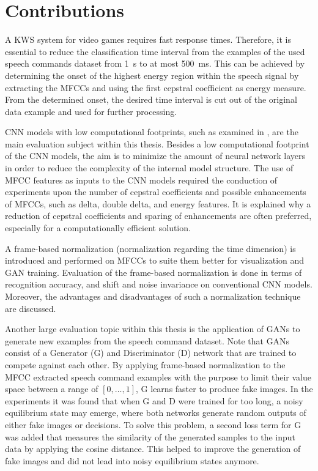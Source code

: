 
\section{Contributions}
A KWS system for video games requires fast response times.
Therefore, it is essential to reduce the classification time interval from the examples of the used speech commands dataset \cite{Warden2018} from \SI{1}{\second} to at most \SI{500}{\milli\second}.
This can be achieved by determining the onset of the highest energy region within the speech signal by extracting the MFCCs and using the first cepstral coefficient as energy measure.
From the determined onset, the desired time interval is cut out of the original data example and used for further processing.

CNN models with low computational footprints, such as examined in \cite{Sainath2015}, are the main evaluation subject within this thesis.
Besides a low computational footprint of the CNN models, the aim is to minimize the amount of neural network layers in order to reduce the complexity of the internal model structure.
The use of MFCC features as inputs to the CNN models required the conduction of experiments upon the number of cepstral coefficients and possible enhancements of MFCCs, such as delta, double delta, and energy features.
It is explained why a reduction of cepstral coefficients and sparing of enhancements are often preferred, especially for a computationally efficient solution.

A frame-based normalization (normalization regarding the time dimension) is introduced and performed on MFCCs to suite them better for visualization and GAN training.
Evaluation of the frame-based normalization is done in terms of recognition accuracy, and shift and noise invariance on conventional CNN models.
Moreover, the advantages and disadvantages of such a normalization technique are discussed.

Another large evaluation topic within this thesis is the application of GANs to generate new examples from the speech command dataset.
Note that GANs consist of a Generator (G) and Discriminator (D) network that are trained to compete against each other.
By applying frame-based normalization to the MFCC extracted speech command examples with the purpose to limit their value space between a range of $[0, \dots, 1]$, G learns faster to produce fake images.
In the experiments it was found that when G and D were trained for too long, a noisy equilibrium state may emerge, where both networks generate random outputs of either fake images or decisions.
To solve this problem, a second loss term for G was added that measures the similarity of the generated samples to the input data by applying the cosine distance.
This helped to improve the generation of fake images and did not lead into noisy equilibrium states anymore.


